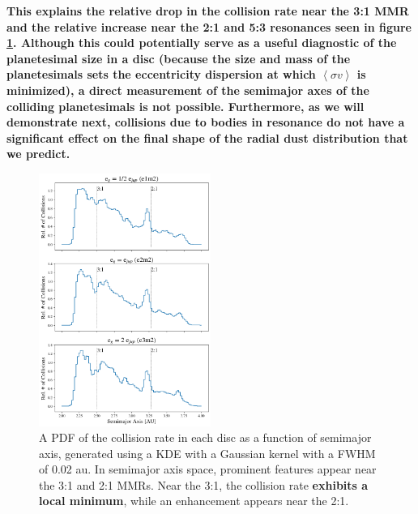 \documentclass[fleqn,usenatbib]{mnras}
\begin{document}
\textbf{ This explains the relative drop in the collision rate near the 3:1 MMR and the relative increase near the 2:1 and 5:3 resonances \textbf{seen in figure \ref{fig:coll_hist_a}}. Although 
this could potentially serve as a useful diagnostic of the planetesimal size in a disc (\textbf{because the size and mass of the planetesimals sets the eccentricity dispersion at which 
$\left< \sigma v \right>$ is minimized}), a direct measurement of the semimajor axes of the colliding planetesimals is not possible. Furthermore, as we will demonstrate next, collisions due 
to bodies in resonance do not have a significant effect on the final shape of the radial dust distribution that we predict.}

\begin{figure}
\begin{center}
    \includegraphics[width=0.5\textwidth]{figures/coll_hist_a.png}
    \caption{A PDF of the collision rate in each disc as a function of semimajor axis, generated using a KDE with a Gaussian kernel with a FWHM of 0.02 au. In semimajor axis space, 
    prominent features appear near the 3:1 and 2:1 MMRs. Near the 3:1, the collision rate \textbf{exhibits a local minimum}, while an enhancement appears near the 
    2:1.\label{fig:coll_hist_a}}
\end{center}
\end{figure}
\end{document}
